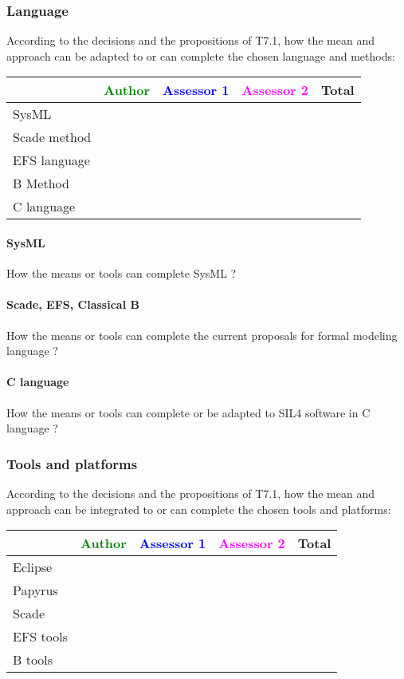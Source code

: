 \subsubsection{Language}


According to the decisions and the propositions of T7.1, how the mean and approach can be adapted to or can complete the chosen language and methods:

\begin{tabular}{|l | c | c | c | c|}
\hline
& \textcolor{green}{Author} & \textcolor{blue}{Assessor 1} & \textcolor{magenta}{Assessor 2} & Total \\
\hline 
SysML  & & & & \\
\hline
Scade method & & & & \\
\hline
EFS language & & & & \\
\hline
B Method & & & & \\
\hline
C language & & & & \\
\hline
\end{tabular}

\paragraph{SysML}
How the means or tools can complete SysML ?


\paragraph{Scade, EFS, Classical B}
How the means or tools can complete the current proposals for formal modeling language ?

\paragraph{C language}
How the means or tools can complete or be adapted to SIL4 software in C language ?

\subsubsection{Tools and platforms}

According to the decisions and the propositions of T7.1, how the mean and approach can be integrated to or can complete the chosen tools and platforms:

\begin{tabular}{|l | c | c | c | c|}
\hline
& \textcolor{green}{Author} & \textcolor{blue}{Assessor 1} & \textcolor{magenta}{Assessor 2} & Total \\
\hline 
Eclipse & & & &  \\
\hline
Papyrus  & & & & \\
\hline
Scade & & & & \\
\hline
EFS tools & & & & \\
\hline
B tools & & & & \\
\hline
\end{tabular}


